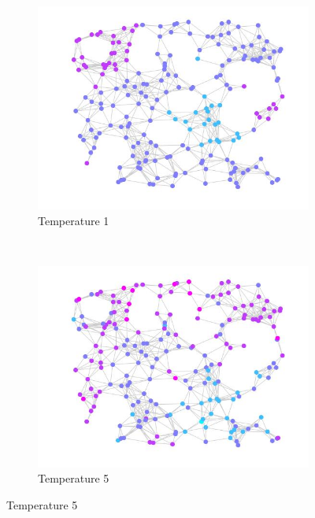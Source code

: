 \documentclass[12pt]{report}
\begin{document}
\begin{figure}[t]
    \centering
    \begin{subfigure}[b]{0.4\textwidth}
        \includegraphics[width=\textwidth]{rggT1}
        \caption{Temperature 1}

    \end{subfigure}
	~ 
    \begin{subfigure}[b]{0.4\textwidth}
        \includegraphics[width=\textwidth]{rggT5}
        \caption{Temperature 5}

    \end{subfigure}


\end{figure}
\end{document}
